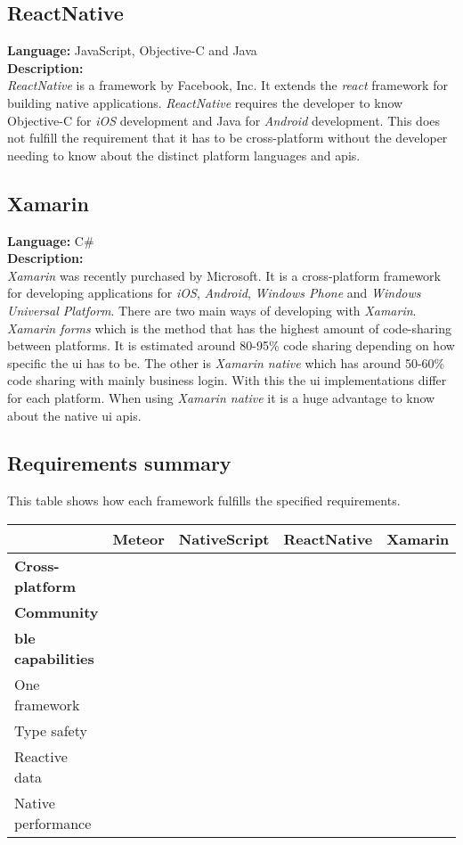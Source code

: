 \subsection*{ReactNative}
\textbf{Language:} JavaScript, Objective-C and Java
\\
\textbf{Description:}
\\
\textit{ReactNative} is a framework by Facebook, Inc.
It extends the \textit{\gls{react}} framework for building native applications. 
\textit{ReactNative} requires the developer to know Objective-C for \textit{iOS} development and Java for \textit{Android} development. 
This does not fulfill the requirement that it has to be cross-platform without the developer needing to know about the distinct platform languages and \glspl{api}.


\subsection*{Xamarin}
\textbf{Language:} C\#
\\
\textbf{Description:}
\\ 
\textit{Xamarin} was recently purchased by Microsoft. It is a cross-platform framework for developing applications for \textit{iOS}, \textit{Android}, \textit{Windows Phone} and \textit{Windows Universal Platform}. 
There are two main ways of developing with \textit{Xamarin}. 
\textit{Xamarin forms} which is the method that has the highest amount of code-sharing between platforms. 
It is estimated around 80-95\% code sharing depending on how specific the \gls{ui} has to be. 
The other is \textit{Xamarin native} which has around 50-60\% code sharing with mainly business login.
With this the \gls{ui} implementations differ for each platform. 
When using \textit{Xamarin native} it is a huge advantage to know about the native \gls{ui} \glspl{api}.

\subsection*{Requirements summary}
This table shows how each framework fulfills the specified requirements.
	
	\begin{tabularx}{\textwidth}{|l|C C C C|}
	\hline 
	 & Meteor & NativeScript & ReactNative & Xamarin \\ 
	\hline 
	\textbf{Cross-platform} & \cmark & \cmark & \cmark & \cmark \\ 
	\hline 
	\textbf{Community} & \cmark & \cmark & \cmark & \cmark \\ 
	\hline 
	\textbf{\gls{ble} capabilities} & \cmark & \cmark & \cmark & \cmark \\ 
	\hline 
	One framework & \cmark & \cmark & \xmark & \xmark \\ 
	\hline 
	Type safety & \xmark & \cmark & \xmark & \cmark \\ 
	\hline 
	Reactive data & \cmark & \xmark & \xmark & \xmark \\ 
	\hline 
	Native performance & \xmark & \cmark & \cmark & \cmark \\ 
	\hline 
	\end{tabularx} 
	
